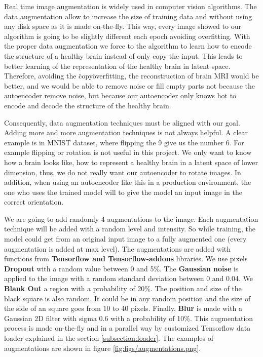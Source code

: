 Real time image augmentation is widely used in computer vision algorithms. The data augmentation allow to increase the size of training data and without using any disk space as it is made on-the-fly. This way, every image showed to our algorithm is going to be slightly different each epoch avoiding overfitting. With the proper data augmentation we force to the algorithm to learn how to encode the structure of a healthy brain instead of only copy the input. This leads to better learning of the representation of the healthy brain in latent space. Therefore, avoiding the \"copy\" overfitting, the reconstruction of brain MRI would be better, and we would be able to remove noise or fill empty parts not because the autoencoder remove noise, but because our autoencoder only knows hot to encode and decode the structure of the healthy brain.

Consequently, data augmentation techniques must be aligned with our goal. Adding more and more augmentation techniques is not always helpful. A clear example is in MNIST dataset, where flipping the 9 give us the number 6. For example flipping or rotation is not useful in this project. We only want to know how a brain looks like, how to represent a healthy brain in a latent space of lower dimension, thus, we do not really want our autoencoder to rotate images. In addition, when using an autoencoder like this in a production environment, the one who uses the trained model will to give the model an input image in the correct orientation. 

We are going to add randomly 4 augmentations to the image. Each augmentation technique will be added with a random level and intensity. So while training, the model could get from an original input image to a fully augmented one (every augmentation is added at max level). The augmentations are added with functions from \textbf{Tensorflow and Tensorflow-addons} libraries. We use pixels \textbf{Dropout} with a random value between 0 and 5\%. The \textbf{Gaussian noise} is applied to the image with a random standard deviation between 0 and 0.04. We \textbf{Blank Out} a region with a probability of 20\%. The position and size of the black square is also random. It could be in any random position and the size of the side of an square goes from 10 to 40 pixels. Finally, \textbf{Blur} is made with a Gaussian 2D filter with sigma 0.6 with a probability of 10\%. This augmentation process is made on-the-fly and in a parallel way by customized Tensorflow data loader explained in the section \ref{subsection:loader}. The examples of augmentations are shown in figure \ref{fig:figs/augmentations.png}.

